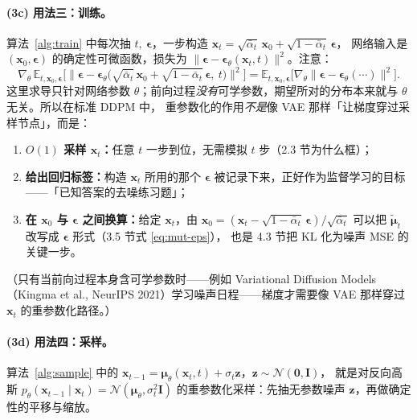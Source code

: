 \documentclass[a4paper,fontset=none,zihao=5]{ctexart}
\numberwithin{equation}{section}
\newcommand{\x}{\mathbf{x}}
\newcommand{\I}{\mathbf{I}}
\newcommand{\N}{\mathcal{N}}
\newcommand{\abar}{\bar{\alpha}}
\newcommand{\eps}{\boldsymbol{\epsilon}}
\newcommand{\epst}{\boldsymbol{\epsilon}_\theta}
\newcommand{\mut}{\tilde{\boldsymbol{\mu}}}
\newcommand{\mutheta}{\boldsymbol{\mu}_\theta}
\newcommand{\E}{\mathbb{E}}
\begin{document}
\paragraph{(3c) 用法三：训练。}算法~\ref{alg:train} 中每次抽 $t,\ \eps$，一步构造 $\x_t=\sqrt{\abar_t}\,\x_0+\sqrt{1-\abar_t}\,\eps$，
网络输入是 $(\x_0,\eps)$ 的确定性可微函数，损失为 $\|\eps-\epst(\x_t,t)\|^2$。注意：
\begin{equation}
  \nabla_\theta\,\E_{t,\x_0,\eps}\Big[\big\|\eps-\epst\big(\sqrt{\abar_t}\,\x_0+\sqrt{1-\abar_t}\,\eps,\ t\big)\big\|^2\Big]
  =\E_{t,\x_0,\eps}\Big[\nabla_\theta\big\|\eps-\epst(\cdots)\big\|^2\Big].
\end{equation}
这里求导只针对网络参数 $\theta$；前向过程\emph{没有}可学参数，期望所对的分布本来就与 $\theta$ 无关。所以在标准 DDPM 中，
重参数化的作用\emph{不是}像 VAE 那样「让梯度穿过采样节点」，而是：
\begin{enumerate}[leftmargin=1.8em,itemsep=1pt,label=(\roman*)]
  \item \textbf{$O(1)$ 采样 $\x_t$：}任意 $t$ 一步到位，无需模拟 $t$ 步（2.3 节为什么框）；
  \item \textbf{给出回归标签：}构造 $\x_t$ 所用的那个 $\eps$ 被记录下来，正好作为监督学习的目标——「已知答案的去噪练习题」；
  \item \textbf{在 $\x_0$ 与 $\eps$ 之间换算：}给定 $\x_t$，由 $\x_0=(\x_t-\sqrt{1-\abar_t}\,\eps)/\sqrt{\abar_t}$ 可以把 $\mut_t$ 改写成 $\eps$ 形式（3.5 节式 \eqref{eq:mut-eps}），
        也是 4.3 节把 KL 化为噪声 MSE 的关键一步。
\end{enumerate}
（只有当前向过程本身含可学参数时——例如 Variational Diffusion Models（Kingma et al., NeurIPS 2021）学习噪声日程——梯度才需要像 VAE 那样穿过 $\x_t$ 的重参数化路径。）

\paragraph{(3d) 用法四：采样。}算法~\ref{alg:sample} 中的 $\x_{t-1}=\mutheta(\x_t,t)+\sigma_t\mathbf{z}$，$\mathbf{z}\sim\N(\mathbf{0},\I)$，
就是对反向高斯 $p_\theta(\x_{t-1}\mid\x_t)=\N(\mutheta,\sigma_t^2\I)$ 的重参数化采样：先抽无参数噪声 $\mathbf{z}$，再做确定性的平移与缩放。
\end{document}
